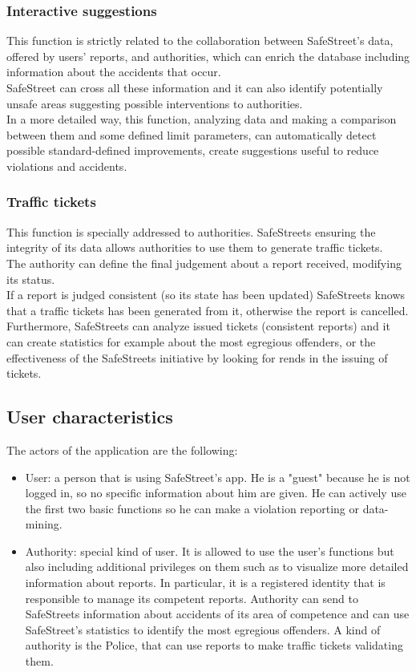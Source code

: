 \documentclass{article}
\begin{document}
	\subsubsection{Interactive suggestions}
	This function is strictly related to the collaboration between SafeStreet's data, offered by users' reports, and authorities, which can enrich the database including information about the accidents that occur. \\SafeStreet can cross all these information and it can also identify potentially unsafe areas suggesting possible interventions to authorities. \\
	In a more detailed way, this function, analyzing data and making a comparison between them and some defined limit parameters, can automatically detect possible standard-defined improvements, create suggestions useful to reduce violations and accidents.
	
	\subsubsection{Traffic tickets}
	This function is specially addressed to authorities. SafeStreets ensuring the integrity of its data allows authorities to use them to generate traffic tickets. \\
	The authority can define the final judgement about a report received, modifying its status.\\
	If a report is judged consistent (so its state has been updated) SafeStreets knows that a traffic tickets has been generated from it, otherwise the report is cancelled.\\
	Furthermore, SafeStreets can analyze issued tickets (consistent reports) and it can create statistics for example about the most egregious offenders, or the effectiveness of the SafeStreets initiative by looking for rends in the issuing of tickets.
	
	
	\subsection{User characteristics}
	The actors of the application are the following:
	\begin{itemize}
		\item User: a person that is using SafeStreet's app. He is a "guest" because he is not logged in, so no specific information about him are given. He can actively use the first two basic functions so he can make a violation reporting or data-mining.
		\item Authority: special kind of user. It is allowed to use the user's functions but also including additional privileges on them such as to visualize more detailed information about reports. In particular, it is a registered identity that is responsible to manage its competent reports. Authority can send to SafeStreets information about accidents of its area of competence and can use SafeStreet's statistics to identify the most egregious offenders.
		A kind of authority is the Police, that can use reports to make traffic tickets validating them.
	\end{itemize}
	
\end{document}
